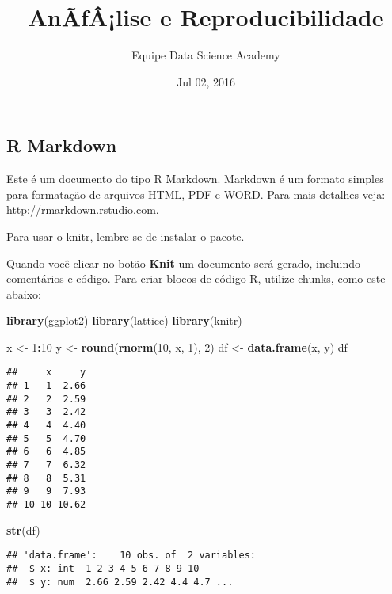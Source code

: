 \documentclass[]{article}
\title{AnÃƒÂ¡lise e Reproducibilidade}
\author{Equipe Data Science Academy}
\date{Jul 02, 2016}
\newenvironment{Shaded}{\begin{snugshade}}{\end{snugshade}}
\newcommand{\KeywordTok}[1]{\textcolor[rgb]{0.13,0.29,0.53}{\textbf{#1}}}
\newcommand{\DecValTok}[1]{\textcolor[rgb]{0.00,0.00,0.81}{#1}}
\newcommand{\StringTok}[1]{\textcolor[rgb]{0.31,0.60,0.02}{#1}}
\newcommand{\OperatorTok}[1]{\textcolor[rgb]{0.81,0.36,0.00}{\textbf{#1}}}
\newcommand{\NormalTok}[1]{#1}
\begin{document}
\maketitle

\subsection{R Markdown}\label{r-markdown}

Este é um documento do tipo R Markdown. Markdown é um formato simples
para formatação de arquivos HTML, PDF e WORD. Para mais detalhes veja:
\url{http://rmarkdown.rstudio.com}.

Para usar o knitr, lembre-se de instalar o pacote.

Quando você clicar no botão \textbf{Knit} um documento será gerado,
incluindo comentários e código. Para criar blocos de código R, utilize
chunks, como este abaixo:

\begin{Shaded}
\begin{Highlighting}[]
\KeywordTok{library}\NormalTok{(ggplot2)}
\KeywordTok{library}\NormalTok{(lattice)}
\KeywordTok{library}\NormalTok{(knitr)}
\end{Highlighting}
\end{Shaded}

\begin{Shaded}
\begin{Highlighting}[]
\NormalTok{x <-}\StringTok{ }\DecValTok{1}\OperatorTok{:}\DecValTok{10}
\NormalTok{y <-}\StringTok{ }\KeywordTok{round}\NormalTok{(}\KeywordTok{rnorm}\NormalTok{(}\DecValTok{10}\NormalTok{, x, }\DecValTok{1}\NormalTok{), }\DecValTok{2}\NormalTok{)}
\NormalTok{df <-}\StringTok{ }\KeywordTok{data.frame}\NormalTok{(x, y)}
\NormalTok{df}
\end{Highlighting}
\end{Shaded}

\begin{verbatim}
##     x     y
## 1   1  2.66
## 2   2  2.59
## 3   3  2.42
## 4   4  4.40
## 5   5  4.70
## 6   6  4.85
## 7   7  6.32
## 8   8  5.31
## 9   9  7.93
## 10 10 10.62
\end{verbatim}

\begin{Shaded}
\begin{Highlighting}[]
\KeywordTok{str}\NormalTok{(df)}
\end{Highlighting}
\end{Shaded}

\begin{verbatim}
## 'data.frame':    10 obs. of  2 variables:
##  $ x: int  1 2 3 4 5 6 7 8 9 10
##  $ y: num  2.66 2.59 2.42 4.4 4.7 ...
\end{verbatim}
\end{document}
